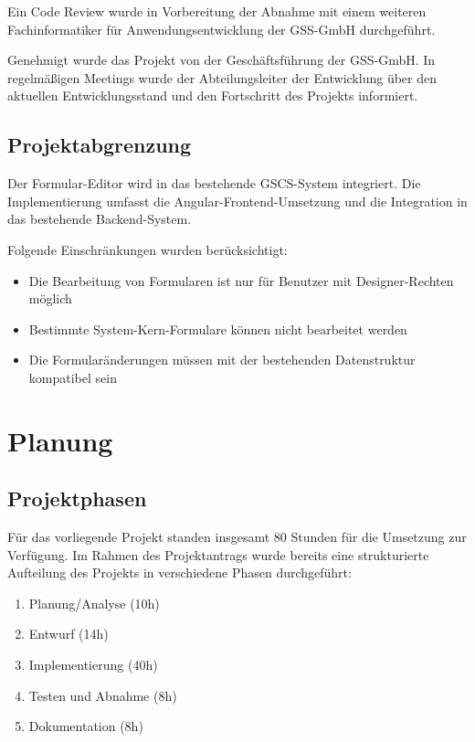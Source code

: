 \documentclass[a4paper,11pt]{article}
\begin{document}
Ein Code Review wurde in Vorbereitung der Abnahme mit einem weiteren Fachinformatiker für Anwendungsentwicklung der GSS-GmbH durchgeführt.

Genehmigt wurde das Projekt von der Geschäftsführung der GSS-GmbH. In regelmäßigen Meetings wurde der Abteilungsleiter der Entwicklung über den aktuellen Entwicklungsstand und den Fortschritt des Projekts informiert.

\subsection{Projektabgrenzung}

Der Formular-Editor wird in das bestehende GSCS-System integriert. Die Implementierung umfasst die Angular-Frontend-Umsetzung und die Integration in das bestehende Backend-System.

Folgende Einschränkungen wurden berücksichtigt:

\begin{itemize}
\item Die Bearbeitung von Formularen ist nur für Benutzer mit Designer-Rechten möglich
\item Bestimmte System-Kern-Formulare können nicht bearbeitet werden
\item Die Formularänderungen müssen mit der bestehenden Datenstruktur kompatibel sein
\end{itemize}

\section{Planung}

\subsection{Projektphasen}

Für das vorliegende Projekt standen insgesamt 80 Stunden für die Umsetzung zur Verfügung. Im Rahmen des Projektantrags wurde bereits eine strukturierte Aufteilung des Projekts in verschiedene Phasen durchgeführt:

\begin{enumerate}
\item Planung/Analyse (10h)
\item Entwurf (14h)
\item Implementierung (40h)
\item Testen und Abnahme (8h)
\item Dokumentation (8h)
\end{enumerate}
\end{document}
